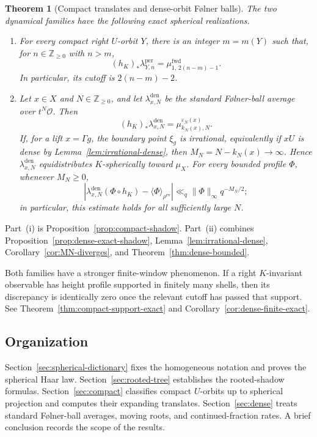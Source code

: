 \documentclass[11pt]{amsart}
\theoremstyle{definition}
\theoremstyle{plain}
\newtheorem{theorem}[definition]{Theorem}
\newcommand{\cO}{\mathcal O}
\newcommand{\ZZ}{\mathbb Z}
\newcommand{\fwd}{\mathrm{fwd}}
\newcommand{\ev}{\mathrm{ev}}
\newcommand{\ang}{\langle}
\newcommand{\rang}{\rangle}
\begin{document}
\begin{theorem}[Compact translates and dense-orbit F{\o}lner balls]
\label{thm:two-families}
The two dynamical families have the following exact spherical realizations.
\begin{enumerate}[label=(\roman*)]
\item For every compact right \(U\)-orbit \(Y\), there is an integer \(m=m(Y)\)
such that, for \(n\in\ZZ_{\ge0}\) with \(n>m\),
\[
(h_K)_*\lambda_{Y,n}^{\mathrm{per}}
 =\mu^{\fwd}_{1,\,2(n-m)-1}.
\]
In particular, its cutoff is \(2(n-m)-2\).
\item Let \(x\in X\) and \(N\in\ZZ_{\ge0}\), and let
\(\lambda_{x,N}^{\mathrm{den}}\) be the standard F{\o}lner-ball average over
\(t^N\cO\).  Then
\[
(h_K)_*\lambda_{x,N}^{\mathrm{den}}
 =\mu^{\varepsilon_N(x)}_{k_N(x),N}.
\]
If, for a lift \(x=\Gamma g\), the boundary point \(\xi_g\) is irrational,
equivalently if \(xU\) is dense by Lemma~\ref{lem:irrational-dense}, then
\(M_N=N-k_N(x)\to\infty\).  Hence
\(\lambda_{x,N}^{\mathrm{den}}\) equidistributes \(K\)-spherically toward
\(\mu_X\).  For every bounded profile \(\Phi\), whenever \(M_N\ge0\),
\[
\left|\lambda_{x,N}^{\mathrm{den}}(\Phi\circ h_K)
      -\ang\Phi\rang_{\rho^{\ev}}\right|
 \ll_q\|\Phi\|_\infty q^{-M_N/2};
\]
in particular, this estimate holds for all sufficiently large \(N\).
\end{enumerate}
\end{theorem}

Part~(i) is Proposition~\ref{prop:compact-shadow}.  Part~(ii) combines
Proposition~\ref{prop:dense-exact-shadow}, Lemma~\ref{lem:irrational-dense},
Corollary~\ref{cor:MN-diverges}, and Theorem~\ref{thm:dense-bounded}.

Both families have a stronger finite-window phenomenon.  If a right
\(K\)-invariant observable has height profile supported in finitely many
shells, then its discrepancy is identically zero once the relevant cutoff has
passed that support.  See Theorem~\ref{thm:compact-support-exact} and
Corollary~\ref{cor:dense-finite-exact}.

\subsection{Organization}
Section~\ref{sec:spherical-dictionary} fixes the homogeneous notation and
proves the spherical Haar law.  Section~\ref{sec:rooted-tree} establishes the
rooted-shadow formulas.  Section~\ref{sec:compact} classifies compact
\(U\)-orbits up to spherical projection and computes their expanding
translates.  Section~\ref{sec:dense} treats standard F{\o}lner-ball averages,
moving roots, and continued-fraction rates.  A brief conclusion records the
scope of the results.
\end{document}
